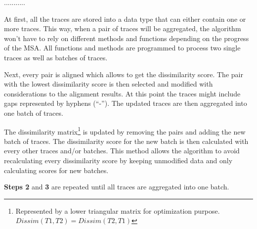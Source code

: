 \documentclass[12pt,a4paper]{article}
\begin{document}
\begin{labeling}{...........}
\item[Step 1] At first, all the traces are stored into a data type that can either contain one or more traces.
This way, when a pair of traces will be aggregated, the algorithm won't have to rely on different methods and functions depending on the progress of the MSA.
All functions and methods are programmed to process two single traces as well as batches of traces.

\item[Step 2] Next, every pair is aligned which allows to get the dissimilarity score.
The pair with the lowest dissimilarity score is then selected and modified with considerations to the alignment results.
At this point the traces might include gaps represented by hyphens (``-'').
The updated traces are then aggregated into one batch of traces.

\item[Step 3] The dissimilarity matrix\footnote{Represented by a lower triangular matrix for optimization purpose. $Dissim(T1, T2) = Dissim(T2, T1)$} is updated by removing the pairs and adding the new batch of traces.
The dissimilarity score for the new batch is then calculated with every other traces and/or batches.
This method allows the algorithm to avoid recalculating every dissimilarity score by keeping unmodified data and only calculating scores for new batches.
\end{labeling}

\noindent\textbf{Steps 2} and \textbf{3} are repeated until all traces are aggregated into one batch.
\end{document}
